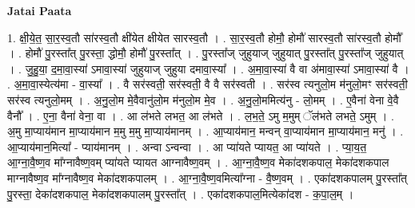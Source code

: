 \documentclass[17pt]{extarticle}
\begin{document}
\textbf{Jatai Paata} \newline

1. क्षी॒ये॒त॒ सा॒र॒स्व॒तौ सा॑रस्व॒तौ क्षी॑येत क्षीयेत सारस्व॒तौ । . सा॒र॒स्व॒तौ होमौ॒ होमौ॑ सारस्व॒तौ सा॑रस्व॒तौ होमौ᳚ । . होमौ॑ पु॒रस्ता᳚त् पु॒रस्ता॒ द्धोमौ॒ होमौ॑ पु॒रस्ता᳚त् । . पु॒रस्ता᳚ज् जुहुयाज् जुहुयात् पु॒रस्ता᳚त् पु॒रस्ता᳚ज् जुहुयात् । . जु॒हु॒या॒ द॒मा॒वा॒स्या॑ ऽमावा॒स्या॑ जुहुयाज् जुहुया दमावा॒स्या᳚ । . अ॒मा॒वा॒स्या॑ वै वा अ॑मावा॒स्या॑ ऽमावा॒स्या॑ वै । . अ॒मा॒वा॒स्येत्य॑मा - वा॒स्या᳚ । . वै सर॑स्वती॒ सर॑स्वती॒ वै वै सर॑स्वती । . सर॑स्व त्यनुलो॒म म॑नुलो॒मꣳ सर॑स्वती॒ सर॑स्व त्यनुलो॒मम् । . अ॒नु॒लो॒म मे॒वैवानु॑लो॒म म॑नुलो॒म मे॒व । . अ॒नु॒लो॒ममित्य॑नु - लो॒मम् । . ए॒वैना॑ वेना वे॒वै वैनौ᳚ । . ए॒ना॒ वैना॑ वेना॒ वा । . आ ल॑भते लभत॒ आ ल॑भते । . ल॒भ॒ते॒ ऽमु म॒मुम् ॅल॑भते लभते॒ ऽमुम् । . अ॒मु मा॒प्याय॑मान मा॒प्याय॑मान म॒मु म॒मु मा॒प्याय॑मानम् । . आ॒प्याय॑मान॒ मन्वन् वा॒प्याय॑मान मा॒प्याय॑मान॒ मनु॑ । . आ॒प्याय॑मान॒मित्या᳚ - प्याय॑मानम् । . अन्वा ऽन्वन्वा । . आ प्या॑यते प्यायत॒ आ प्या॑यते । . प्या॒य॒त॒ आ॒ग्ना॒वै॒ष्ण॒व मा᳚ग्नावैष्ण॒वम् प्या॑यते प्यायत आग्नावैष्ण॒वम् । . आ॒ग्ना॒वै॒ष्ण॒व मेका॑दशकपाल॒ मेका॑दशकपाल माग्नावैष्ण॒व मा᳚ग्नावैष्ण॒व मेका॑दशकपालम् । . आ॒ग्ना॒वै॒ष्ण॒वमित्या᳚ग्ना - वै॒ष्ण॒वम् । . एका॑दशकपालम् पु॒रस्ता᳚त् पु॒रस्ता॒ देका॑दशकपाल॒ मेका॑दशकपालम् पु॒रस्ता᳚त् । . एका॑दशकपाल॒मित्येका॑दश - क॒पा॒ल॒म् । \newline
\end{document}

